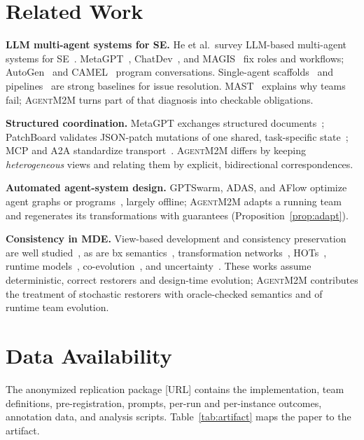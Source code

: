 \documentclass[10pt, anonymous, conference]{IEEEtran}
\theoremstyle{definition}
\theoremstyle{plain}
\theoremstyle{remark}
\newcommand{\tool}{\textsc{AgentM2M}}
\newcommand{\fixme}[1]{{\color{red}[#1]}}
\begin{document}
\section{Related Work}\label{sec:related}

\noindent\textbf{LLM multi-agent systems for SE.} He et al.\ survey LLM-based
multi-agent systems for SE~\cite{he2025lma}. MetaGPT~\cite{hong2024metagpt},
ChatDev~\cite{qian2024chatdev}, and MAGIS~\cite{tao2024magis} fix roles and
workflows; AutoGen~\cite{wu2024autogen} and CAMEL~\cite{li2023camel} program
conversations. Single-agent scaffolds~\cite{yang2024sweagent,wang2025openhands}
and pipelines~\cite{xia2025agentless} are strong baselines for issue
resolution. MAST~\cite{cemri2025mast} explains why teams fail; \tool{} turns
part of that diagnosis into checkable obligations.

\noindent\textbf{Structured coordination.} MetaGPT exchanges structured
documents~\cite{hong2024metagpt}; PatchBoard validates JSON-patch mutations of
one shared, task-specific state~\cite{zhang2026patchboard}; MCP and A2A
standardize transport~\cite{mcp2024,a2a2025}. \tool{} differs by keeping
\emph{heterogeneous} views and relating them by explicit, bidirectional
correspondences.

\noindent\textbf{Automated agent-system design.} GPTSwarm, ADAS, and AFlow
optimize agent graphs or programs~\cite{zhuge2024gptswarm,hu2025adas,zhang2025aflow},
largely offline; \tool{} adapts a running team and regenerates its
transformations with guarantees (Proposition~\ref{prop:adapt}).

\noindent\textbf{Consistency in MDE.} View-based development and consistency
preservation are well
studied~\cite{klare2021vitruvius,bruneliere2019views}, as are bx
semantics~\cite{stevens2010qvt,czarnecki2009bx,foster2007lenses,schurr1994tgg},
transformation networks~\cite{stevens2020networks,klare2023termination}, HOTs~\cite{tisi2009hot},
runtime models~\cite{blair2009runtime}, co-evolution~\cite{hebig2017coevolution},
and uncertainty~\cite{famelis2012partial,eramo2015uncertainty}. These works
assume deterministic, correct restorers and design-time evolution; \tool{}
contributes the treatment of stochastic restorers with oracle-checked
semantics and of runtime team evolution.



\section{Data Availability}\label{sec:data}
The anonymized replication package \fixme{URL} contains the implementation,
team definitions, pre-registration, prompts, per-run and per-instance
outcomes, annotation data, and analysis scripts. Table~\ref{tab:artifact} maps
the paper to the artifact.
\end{document}
